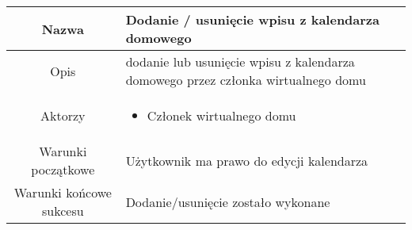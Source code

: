 \documentclass{article}
\begin{document}
\begin{enumerate}
\begin{enumerate}
				\begin{table}[H]
					\centering
					\begin{tabular}{|c|p{7cm}|}
						\hline
						Nazwa                   & \textbf{Dodanie / usunięcie wpisu z kalendarza domowego}                                                                                                                                                                                                                                                                                                                                                                                             \\
						\hline
						Opis                    & dodanie lub usunięcie wpisu z kalendarza domowego przez członka wirtualnego domu                                                                                                                                                                                                                                                                                                                                                                     \\
						\hline
						Aktorzy                 & \begin{itemize}\item Członek wirtualnego domu\end{itemize}                                                                                                                                                                                                                                                                                                                                                                                           \\
						\hline
						Warunki początkowe      & Użytkownik ma prawo do edycji kalendarza                                                                                                                                                                                                                                                                                                                                                                                                             \\
						\hline
						Warunki końcowe sukcesu & Dodanie/usunięcie zostało wykonane                                                                                                                                                                                                                                                                                                                                                                                                                   \\

\end{tabular}
\end{table}
\end{enumerate}
\end{enumerate}
\end{document}
